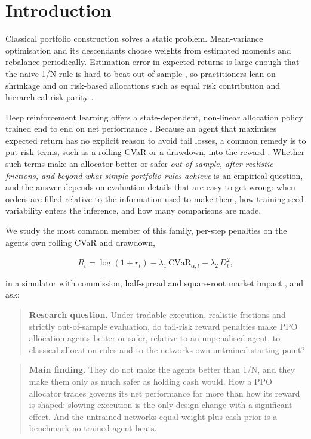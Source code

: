 \documentclass[11pt]{article}
\begin{document}
\section{Introduction}\label{s1}

Classical portfolio construction solves a static problem. Mean-variance optimisation \cite{r1} and its descendants choose weights from estimated moments and rebalance periodically. Estimation error in expected returns is large enough that the naive 1/N rule is hard to beat out of sample \cite{r4}, so practitioners lean on shrinkage \cite{r5} and on risk-based allocations such as equal risk contribution \cite{r6} and hierarchical risk parity \cite{r8}.

Deep reinforcement learning offers a state-dependent, non-linear allocation policy trained end to end on net performance \cite{r12,r13,r14,r16,r17,r53}. Because an agent that maximises expected return has no explicit reason to avoid tail losses, a common remedy is to put risk terms, such as a rolling CVaR or a drawdown, into the reward \cite{r47,r49,r50}. Whether such terms make an allocator better or safer \emph{out of sample, after realistic frictions, and beyond what simple portfolio rules achieve} is an empirical question, and the answer depends on evaluation details that are easy to get wrong: when orders are filled relative to the information used to make them, how training-seed variability enters the inference, and how many comparisons are made.

We study the most common member of this family, per-step penalties on the agent\textquotesingle s own rolling CVaR and drawdown,

\[ R_t = \log(1+r_t) - \lambda_1\,\widehat{\mathrm{CVaR}}_{\alpha,t} - \lambda_2\,D_t^2 , \]

in a simulator with commission, half-spread and square-root market impact \cite{r25,r26,r27}, and ask:

\begin{quote}
\textbf{Research question.} Under tradable execution, realistic frictions and strictly out-of-sample evaluation, do tail-risk reward penalties make PPO allocation agents better or safer, relative to an unpenalised agent, to classical allocation rules and to the network\textquotesingle s own untrained starting point?
\end{quote}

\begin{quote}
\textbf{Main finding.} They do not make the agents better than 1/N, and they make them only as much safer as holding cash would. How a PPO allocator trades governs its net performance far more than how its reward is shaped: slowing execution is the only design change with a significant effect. And the untrained network\textquotesingle s equal-weight-plus-cash prior is a benchmark no trained agent beats.
\end{quote}
\end{document}
